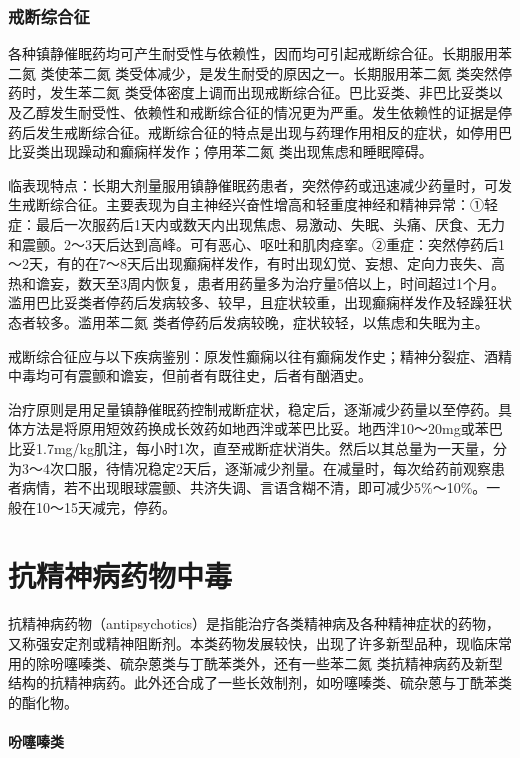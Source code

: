 \subsubsection{戒断综合征}

各种镇静催眠药均可产生耐受性与依赖性，因而均可引起戒断综合征。长期服用苯二氮{}
类使苯二氮{} 类受体减少，是发生耐受的原因之一。长期服用苯二氮{}
类突然停药时，发生苯二氮{}
类受体密度上调而出现戒断综合征。巴比妥类、非巴比妥类以及乙醇发生耐受性、依赖性和戒断综合征的情况更为严重。发生依赖性的证据是停药后发生戒断综合征。戒断综合征的特点是出现与药理作用相反的症状，如停用巴比妥类出现躁动和癫痫样发作；停用苯二氮{}
类出现焦虑和睡眠障碍。

临表现特点：长期大剂量服用镇静催眠药患者，突然停药或迅速减少药量时，可发生戒断综合征。主要表现为自主神经兴奋性增高和轻重度神经和精神异常：①轻症：最后一次服药后1天内或数天内出现焦虑、易激动、失眠、头痛、厌食、无力和震颤。2～3天后达到高峰。可有恶心、呕吐和肌肉痉挛。②重症：突然停药后1～2天，有的在7～8天后出现癫痫样发作，有时出现幻觉、妄想、定向力丧失、高热和谵妄，数天至3周内恢复，患者用药量多为治疗量5倍以上，时间超过1个月。滥用巴比妥类者停药后发病较多、较早，且症状较重，出现癫痫样发作及轻躁狂状态者较多。滥用苯二氮{}
类者停药后发病较晚，症状较轻，以焦虑和失眠为主。

戒断综合征应与以下疾病鉴别：原发性癫痫以往有癫痫发作史；精神分裂症、酒精中毒均可有震颤和谵妄，但前者有既往史，后者有酗酒史。

治疗原则是用足量镇静催眠药控制戒断症状，稳定后，逐渐减少药量以至停药。具体方法是将原用短效药换成长效药如地西泮或苯巴比妥。地西泮10～20mg或苯巴比妥1.7mg/kg肌注，每小时1次，直至戒断症状消失。然后以其总量为一天量，分为3～4次口服，待情况稳定2天后，逐渐减少剂量。在减量时，每次给药前观察患者病情，若不出现眼球震颤、共济失调、言语含糊不清，即可减少5\%～10\%。一般在10～15天减完，停药。

\protect\hypertarget{text00133.html}{}{}

\section{抗精神病药物中毒}

抗精神病药物（antipsychotics）是指能治疗各类精神病及各种精神症状的药物，又称强安定剂或精神阻断剂。本类药物发展较快，出现了许多新型品种，现临床常用的除吩噻嗪类、硫杂蒽类与丁酰苯类外，还有一些苯二氮{}
类抗精神病药及新型结构的抗精神病药。此外还合成了一些长效制剂，如吩噻嗪类、硫杂蒽与丁酰苯类的酯化物。

\paragraph{吩噻嗪类}

